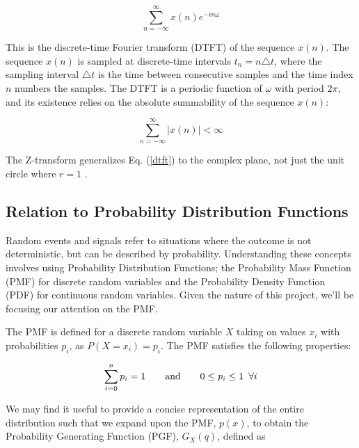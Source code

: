 \documentclass[a4paper]{report}
\begin{document}
\begin{equation}\label{dtft}
\sum^{\infty}_{n = - \infty} x(n)e^{-i n \omega}
\end{equation}

This is the discrete-time Fourier transform (DTFT) of the sequence $x(n)$. The sequence $x(n)$ is sampled at discrete-time intervals $t_n = n \triangle t$, where the sampling interval $\triangle t$ is the time between consecutive samples and the time index $n$ numbers the samples. The DTFT is a periodic function of $\omega$ with period $2\pi$, and its existence relies on the absolute summability of the sequence $x(n)$:

\begin{equation}
\sum^{\infty}_{n = -\infty} |x(n)| < \infty
\end{equation}

The Z-transform generalizes Eq. (\ref{dtft}) to the complex plane, not just the unit circle where $r = 1$ \citep{Oppenheim1989DTSP}.

\subsection{Relation to Probability Distribution Functions}\label{pdfs}
Random events and signals refer to situations where the outcome is not deterministic, but can be described by probability. Understanding these concepts involves using Probability Distribution Functions; the Probability Mass Function (PMF) for discrete random variables and the Probability Density Function (PDF) for continuous random variables. Given the nature of this project, we'll be focusing our attention on the PMF.

The PMF is defined for a discrete random variable $X$ taking on values $x_i$ with probabilities $p_i$, as $P(X=x_i) = p_i$. The PMF satisfies the following properties:

\begin{equation}
    \sum_{i=0}^n p_i = 1 \hspace{2em}\text{and}\hspace{2em} 0 \leq p_i \leq 1 \hspace{0.5em}\forall i
\end{equation}

We may find it useful to provide a concise representation of the entire distribution such that we expand upon the PMF, $p(x)$, to obtain the Probability Generating Function (PGF), $G_X(q)$, defined as
\end{document}

